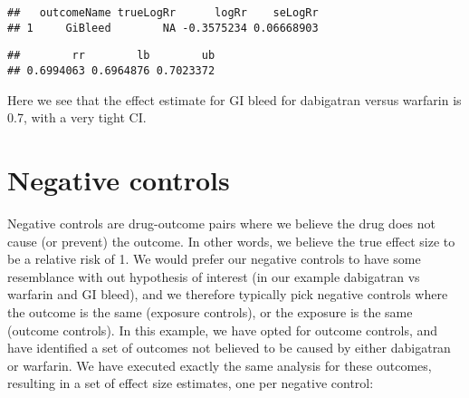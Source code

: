 \documentclass[]{article}
\newenvironment{Shaded}{\begin{snugshade}}{\end{snugshade}}
\newcommand{\DecValTok}[1]{\textcolor[rgb]{0.00,0.00,0.81}{#1}}
\newcommand{\KeywordTok}[1]{\textcolor[rgb]{0.13,0.29,0.53}{\textbf{#1}}}
\newcommand{\NormalTok}[1]{#1}
\newcommand{\OperatorTok}[1]{\textcolor[rgb]{0.81,0.36,0.00}{\textbf{#1}}}
\newcommand{\StringTok}[1]{\textcolor[rgb]{0.31,0.60,0.02}{#1}}
\begin{document}
\begin{verbatim}
##   outcomeName trueLogRr      logRr    seLogRr
## 1     GiBleed        NA -0.3575234 0.06668903
\end{verbatim}

\begin{Shaded}
\end{Shaded}

\begin{verbatim}
##        rr        lb        ub 
## 0.6994063 0.6964876 0.7023372
\end{verbatim}

Here we see that the effect estimate for GI bleed for dabigatran versus
warfarin is 0.7, with a very tight CI.

\hypertarget{negative-controls}{%
\section{Negative controls}\label{negative-controls}}

Negative controls are drug-outcome pairs where we believe the drug does
not cause (or prevent) the outcome. In other words, we believe the true
effect size to be a relative risk of 1. We would prefer our negative
controls to have some resemblance with out hypothesis of interest (in
our example dabigatran vs warfarin and GI bleed), and we therefore
typically pick negative controls where the outcome is the same (exposure
controls), or the exposure is the same (outcome controls). In this
example, we have opted for outcome controls, and have identified a set
of outcomes not believed to be caused by either dabigatran or warfarin.
We have executed exactly the same analysis for these outcomes, resulting
in a set of effect size estimates, one per negative control:

\begin{Shaded}
\end{Shaded}
\end{document}
